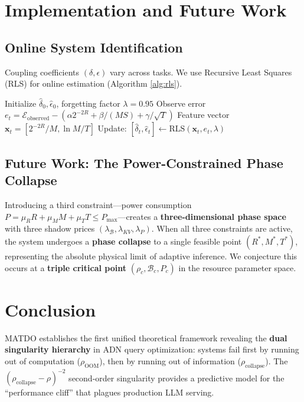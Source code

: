 \documentclass[11pt,a4paper]{article}
\theoremstyle{plain}
\theoremstyle{definition}
\theoremstyle{remark}
\begin{document}
\section{Implementation and Future Work}\label{sec:implementation}

\subsection{Online System Identification}
Coupling coefficients $(\delta, \epsilon)$ vary across tasks. We use Recursive Least Squares (RLS) for online estimation (Algorithm \ref{alg:rls}).

\begin{algorithm}[h]
\caption{Online Coupling Coefficient Estimation}
\label{alg:rls}
\begin{algorithmic}[1]
\State Initialize $\hat{\delta}_0, \hat{\epsilon}_0$, forgetting factor $\lambda = 0.95$
    \State Observe error $e_t = \mathcal{E}_{\text{observed}} - (\alpha 2^{-2R} + \beta/(MS) + \gamma/\sqrt{T})$
    \State Feature vector $\mathbf{x}_t = [2^{-2R}/M, \ln M/T]$
    \State Update: $[\hat{\delta}_t, \hat{\epsilon}_t] \gets \text{RLS}(\mathbf{x}_t, e_t, \lambda)$
\EndFor
\end{algorithmic}
\end{algorithm}

\subsection{Future Work: The Power-Constrained Phase Collapse}
Introducing a third constraint---power consumption $P = \mu_R R + \mu_M M + \mu_T T \leq P_{\max}$---creates a \textbf{three-dimensional phase space} with three shadow prices $(\lambda_{\mathcal{B}}, \lambda_{KV}, \lambda_P)$. When all three constraints are active, the system undergoes a \textbf{phase collapse} to a single feasible point $(R^*, M^*, T^*)$, representing the absolute physical limit of adaptive inference. We conjecture this occurs at a \textbf{triple critical point} $(\rho_c, \mathcal{B}_c, P_c)$ in the resource parameter space.

\section{Conclusion}

MATDO establishes the first unified theoretical framework revealing the \textbf{dual singularity hierarchy} in ADN query optimization: systems fail first by running out of computation ($\rho_{\text{OOM}}$), then by running out of information ($\rho_{\text{collapse}}$). The $(\rho_{\text{collapse}} - \rho)^{-2}$ second-order singularity provides a predictive model for the ``performance cliff'' that plagues production LLM serving.
\end{document}

